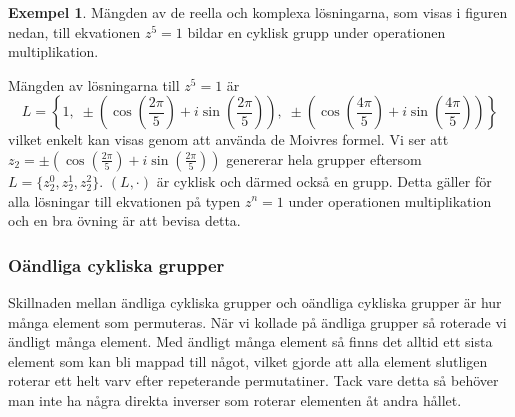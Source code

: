 \documentclass{article}
\theoremstyle{definition}
\newtheorem{exmp}[thm]{Exempel}
\begin{document}
\begin{exmp}
  Mängden av de reella och komplexa lösningarna, som visas i figuren nedan,
  till ekvationen $z^5 = 1$ bildar en cyklisk grupp under operationen multiplikation.
  
  \begin{center}
  \end{center}
  Mängden av lösningarna till $z^5 = 1$ är
  \[ L = \left\{ 
  1, \; 
  \pm \left( \cos \left( \frac{2 \pi}{5} \right) + i \sin \left( \frac{2 \pi}{5} \right) \right), \;
  \pm \left( \cos \left( \frac{4 \pi}{5} \right) + i \sin \left( \frac{4 \pi}{5} \right) \right)
  \right\} \]
  vilket enkelt kan visas genom att använda de Moivres formel. Vi ser att
  $z_2 = 
  \pm \left( \cos \left( \frac{2 \pi}{5} \right) + i \sin \left( \frac{2 \pi}{5} \right) \right)$
  genererar hela grupper eftersom $L = \{ z_2^0, z_2^1, z_2^2 \}$. $(L, \cdot)$ är cyklisk 
  och därmed också en grupp. Detta gäller för alla lösningar till ekvationen 
  på typen $z^n = 1$ under operationen multiplikation
  och en bra övning är att bevisa detta. 
\end{exmp}

\subsubsection{Oändliga cykliska grupper}
Skillnaden mellan ändliga cykliska grupper och oändliga cykliska grupper är 
hur många element som permuteras. 
När vi kollade på ändliga grupper så roterade vi ändligt många element. 
Med ändligt många element så finns det alltid ett sista element
som kan bli mappad till något, 
vilket gjorde att alla element slutligen roterar ett helt varv
efter repeterande permutatiner.
Tack vare detta så behöver man inte ha några direkta inverser som roterar elementen 
åt andra hållet. 
\end{document}
